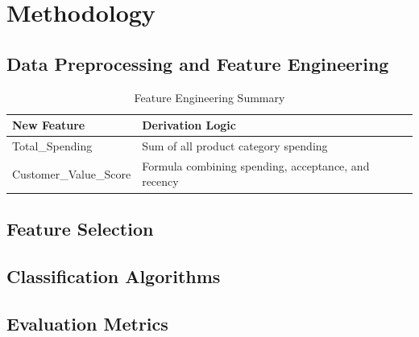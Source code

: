 \section{Methodology}

\subsection{Data Preprocessing and Feature Engineering}

\begin{table}[htbp]
\caption{Feature Engineering Summary}
\begin{center}
\begin{tabular}{|l|p{5cm}|}
\hline
\textbf{New Feature} & \textbf{Derivation Logic} \\
\hline
Total\_Spending & Sum of all product category spending \\
Customer\_Value\_Score & Formula combining spending, acceptance, and recency \\
\hline
\end{tabular}
\label{tab:feature_eng}
\end{center}
\end{table}

\subsection{Feature Selection}

\subsection{Classification Algorithms}

\subsection{Evaluation Metrics}

